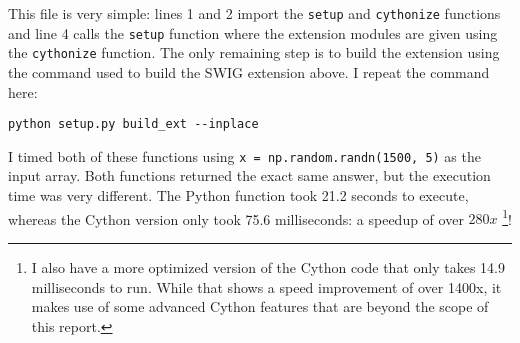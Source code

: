     \noindent This file is very simple: lines 1 and 2 import the \texttt{setup} and \texttt{cythonize} functions and line 4 calls the \texttt{setup} function where the extension modules are given using the \texttt{cythonize} function. The only remaining step is to build the extension using the command used to build the SWIG extension above. I repeat the command here:

    \vspace{.2in}
    \begin{lstlisting}[numbers=none]
      python setup.py build_ext --inplace
    \end{lstlisting}
    \mainstretch{}

    \noindent I timed both of these functions using \texttt{x = np.random.randn(1500, 5)} as the input array. Both functions returned the exact same answer, but the execution time was very different. The Python function took 21.2 seconds to execute, whereas the Cython version only took 75.6 milliseconds: a speedup of over $280x$ \footnote{I also have a more optimized version of the Cython code that only takes 14.9 milliseconds to run. While that shows a speed improvement of over 1400x, it makes use of some advanced Cython features that are beyond the scope of this report.}!
